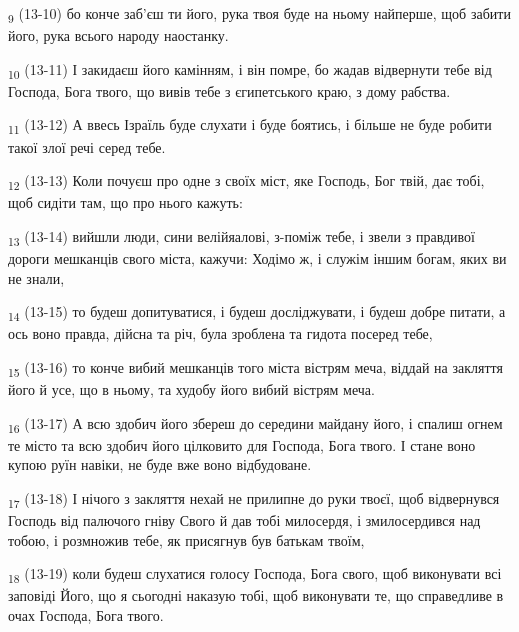 \begin{tcolorbox}
\textsubscript{9} (13-10) бо конче заб'єш ти його, рука твоя буде на ньому найперше, щоб забити його, рука всього народу наостанку.
\end{tcolorbox}
\begin{tcolorbox}
\textsubscript{10} (13-11) І закидаєш його камінням, і він помре, бо жадав відвернути тебе від Господа, Бога твого, що вивів тебе з єгипетського краю, з дому рабства.
\end{tcolorbox}
\begin{tcolorbox}
\textsubscript{11} (13-12) А ввесь Ізраїль буде слухати і буде боятись, і більше не буде робити такої злої речі серед тебе.
\end{tcolorbox}
\begin{tcolorbox}
\textsubscript{12} (13-13) Коли почуєш про одне з своїх міст, яке Господь, Бог твій, дає тобі, щоб сидіти там, що про нього кажуть:
\end{tcolorbox}
\begin{tcolorbox}
\textsubscript{13} (13-14) вийшли люди, сини велійяалові, з-поміж тебе, і звели з правдивої дороги мешканців свого міста, кажучи: Ходімо ж, і служім іншим богам, яких ви не знали,
\end{tcolorbox}
\begin{tcolorbox}
\textsubscript{14} (13-15) то будеш допитуватися, і будеш досліджувати, і будеш добре питати, а ось воно правда, дійсна та річ, була зроблена та гидота посеред тебе,
\end{tcolorbox}
\begin{tcolorbox}
\textsubscript{15} (13-16) то конче вибий мешканців того міста вістрям меча, віддай на закляття його й усе, що в ньому, та худобу його вибий вістрям меча.
\end{tcolorbox}
\begin{tcolorbox}
\textsubscript{16} (13-17) А всю здобич його збереш до середини майдану його, і спалиш огнем те місто та всю здобич його цілковито для Господа, Бога твого. І стане воно купою руїн навіки, не буде вже воно відбудоване.
\end{tcolorbox}
\begin{tcolorbox}
\textsubscript{17} (13-18) І нічого з закляття нехай не прилипне до руки твоєї, щоб відвернувся Господь від палючого гніву Свого й дав тобі милосердя, і змилосердився над тобою, і розмножив тебе, як присягнув був батькам твоїм,
\end{tcolorbox}
\begin{tcolorbox}
\textsubscript{18} (13-19) коли будеш слухатися голосу Господа, Бога свого, щоб виконувати всі заповіді Його, що я сьогодні наказую тобі, щоб виконувати те, що справедливе в очах Господа, Бога твого.
\end{tcolorbox}
